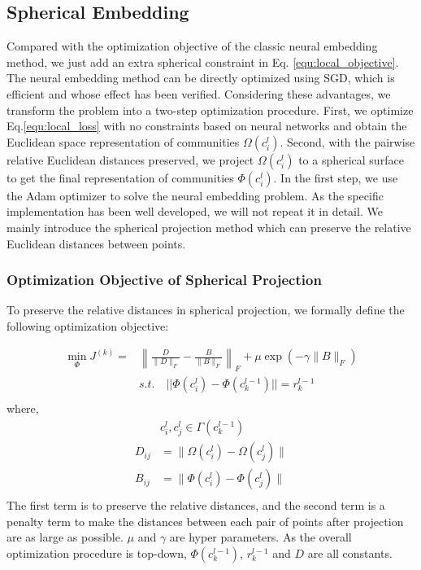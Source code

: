 \documentclass{article}
\theoremstyle{definition}
\begin{document}
	 \subsection{Spherical Embedding}
	 Compared with the optimization objective of the classic neural embedding method, we just add an extra spherical constraint in Eq. \ref{equ:local_objective}. The neural embedding method can be directly optimized using SGD, which is efficient and whose effect has been verified. Considering these advantages, we transform the problem into a two-step optimization procedure. First, we optimize Eq.\ref{equ:local_loss} with no constraints based on neural networks and obtain the Euclidean space representation of communities $\Omega(c^l_i)$. Second, with the pairwise relative Euclidean distances preserved, we project $\Omega(c^l_i)$ to a spherical surface to get the final representation of communities $\Phi(c_i^l)$. 
	 In the first step, we use the Adam optimizer \cite{Rushing2005ADaM} to solve the neural embedding problem. As the specific implementation has been well developed, we will not repeat it in detail. We mainly introduce the spherical projection method which can preserve the relative Euclidean distances between points.
	 \subsubsection{Optimization Objective of Spherical Projection}
	 To preserve the relative distances in spherical projection, we formally define the following optimization objective: 

    \begin{equation}
    \label{equ:sphere_objective}
    \begin{split}
    \min_{\Phi} J^{(k)} =  & \left\lVert\frac{D}{\lVert D \rVert_F} - \frac{B}{\lVert B \rVert_F}\right\rVert_F + \mu \exp(- \gamma \lVert B \rVert_F)\\ 
    & s.t. \quad || \Phi(c_i^{l})  - \Phi(c_k^{l-1})||= r_k^{l-1}\\
    \end{split}
    \end{equation}
	 where,
	 \[
	 \begin{split}
	 	& c_i^l,c_j^l \in \Gamma(c_k^{l-1}) \\
	 	D_{ij} & = \lVert \Omega(c^{l}_i) - \Omega(c^{l}_j)\rVert \\
	 	B_{ij} & = \lVert \Phi(c^{l}_i) - \Phi(c^{l}_j)\rVert \\
	 \end{split}
	 \]
	 The first term is to preserve the relative distances, and the second term is a penalty term to make the distances between each pair of points after projection are as large as possible. $\mu$ and $\gamma$ are hyper parameters. As the overall optimization procedure is top-down, $\Phi(c_k^{l-1})$, $r_k^{l-1}$ and $D$ are all constants. 
   
\end{document}
